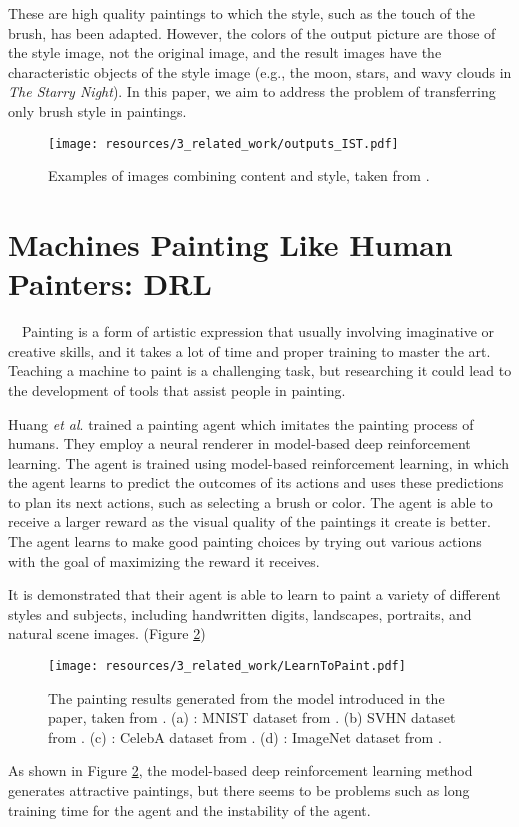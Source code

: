 These are high quality paintings to which the style, such as the touch of the 
brush, has been adapted. 
However, the colors of the output picture are those of the style image, 
not the original image, and the result images have the characteristic objects of 
the style image (e.g., the moon, stars, and wavy clouds in \textit{The Starry Night}).
In this paper, we aim to address the problem of transferring only brush style 
in paintings.

\begin{figure}[p]
    \centering
    \texttt{[image: resources/3\_related\_work/outputs\_IST.pdf]}
    \caption{
        Examples of images combining content and style, taken from
        \cite{Gatys_2016_CVPR}.
    }
    \label{output_IST}
\end{figure}
\clearpage

\section{Machines Painting Like Human Painters: DRL}
　Painting is a form of artistic expression that usually involving imaginative or 
creative skills, and it takes a lot of time and proper training to master the 
art.  Teaching a machine to paint is a challenging task, but researching it 
could lead to the development of tools that assist people in painting.

Huang \textit{et al}. \cite{Huang_2019_ICCV} trained a painting agent which 
imitates the painting process of humans. 
They employ a neural renderer in model-based deep reinforcement learning.
The agent is trained using model-based reinforcement learning, in which the 
agent learns to predict the outcomes of its actions and uses these predictions 
to plan its next actions, such as selecting a brush or color.
The agent is able to receive a larger reward as the visual quality of the 
paintings it create is better. The agent learns to make good painting choices by 
trying out various actions with the goal of maximizing the reward it receives.

It is demonstrated that their agent is able to learn to paint a variety of 
different styles and subjects, including handwritten digits, landscapes, 
portraits, and natural scene images. (Figure \ref{LearnToPaint})
\begin{figure}[h]
    \centering
    \texttt{[image: resources/3\_related\_work/LearnToPaint.pdf]}
    \caption{
        The painting results generated from the model introduced in the paper,
        taken from \cite{Huang_2019_ICCV}.
        (a) : MNIST dataset from \cite{deng2012mnist}. (b) SVHN dataset from \cite{netzer2011reading}.
        (c) : CelebA dataset from \cite{Liu_2015_ICCV}.
        (d) : ImageNet dataset from \cite{russakovsky2015imagenet}.
    }
    \label{LearnToPaint}
\end{figure}
\newline
As shown in Figure \ref{LearnToPaint}, the model-based deep reinforcement 
learning method generates attractive paintings, but there seems to be problems
such as long training time for the agent and the instability of the agent.

